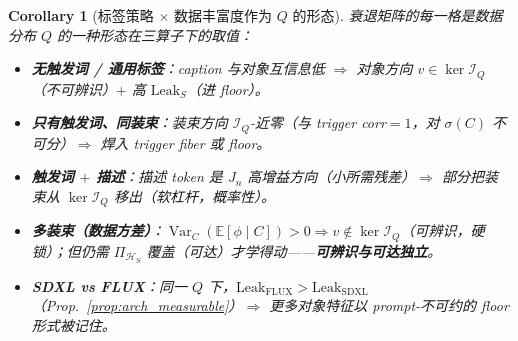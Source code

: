 \documentclass[11pt,a4paper]{article}
\newtheorem{corollary}[theorem]{Corollary}
\DeclareMathOperator{\Var}{Var}
\newcommand{\E}{\mathbb{E}}
\newcommand{\cH}{\mathcal{H}}
\newcommand{\cI}{\mathcal{I}}
\newcommand{\ProjectOp}{\Pi}
\begin{document}
\begin{corollary}[标签策略 $\times$ 数据丰富度作为 $Q$ 的形态]\label{cor:matrix_demote}
衰退矩阵的每一格是数据分布 $Q$ 的一种形态在三算子下的取值：
\begin{itemize}[nosep]
\item \textbf{无触发词 / 通用标签}：caption 与对象互信息低 $\Rightarrow$ 对象方向 $v\in\ker\cI_Q$（不可辨识）$+$ 高 $\mathrm{Leak}_S$（进 floor）。
\item \textbf{只有触发词、同装束}：装束方向 $\cI_Q$-近零（与 trigger corr$=1$，对 $\sigma(C)$ 不可分）$\Rightarrow$ 焊入 trigger fiber 或 floor。
\item \textbf{触发词 $+$ 描述}：描述 token 是 $J_n$ 高增益方向（小所需残差）$\Rightarrow$ 部分把装束从 $\ker\cI_Q$ 移出（软杠杆，概率性）。
\item \textbf{多装束（数据方差）}：$\Var_C(\E[\phi\mid C])>0\Rightarrow v\notin\ker\cI_Q$（可辨识，硬锁）；但仍需 $\ProjectOp_{\cH_S}$ 覆盖（可达）才学得动——\textbf{可辨识与可达独立}。
\item \textbf{SDXL vs FLUX}：同一 $Q$ 下，$\mathrm{Leak}_{\mathrm{FLUX}}>\mathrm{Leak}_{\mathrm{SDXL}}$（Prop.~\ref{prop:arch_measurable}）$\Rightarrow$ 更多对象特征以 prompt-不可约的 floor 形式被记住。
\end{itemize}
\end{corollary}

\end{document}
